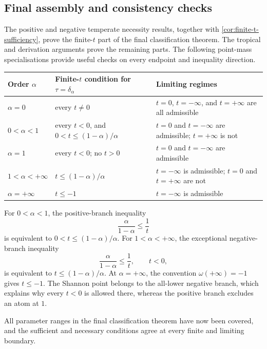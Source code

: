 \documentclass[9pt]{extarticle}
\theoremstyle{definition}
\theoremstyle{remark}
\begin{document}
\subsection{Final assembly and consistency checks}

The positive and negative temperate necessity results, together with
\cref{cor:finite-t-sufficiency}, prove the finite-$t$ part of the final
classification theorem. The tropical and derivation arguments prove
the remaining parts. The following point-mass specialisations provide useful
checks on every endpoint and inequality direction.

\begin{center}
\begin{tabular}{>{\raggedright\arraybackslash}p{}
                >{\raggedright\arraybackslash}p{}
                >{\raggedright\arraybackslash}p{}}
\toprule
Order $\alpha$ & Finite-$t$ condition for $\tau=\delta_\alpha$
& Limiting regimes \\
\midrule
$\alpha=0$
& every $t\neq0$
& $t=0$, $t=-\infty$, and $t=+\infty$ are all admissible \\
$0<\alpha<1$
& every $t<0$, and $0<t\leq(1-\alpha)/\alpha$
& $t=0$ and $t=-\infty$ are admissible; $t=+\infty$ is not \\
$\alpha=1$
& every $t<0$; no $t>0$
& $t=0$ and $t=-\infty$ are admissible \\
$1<\alpha<+\infty$
& $t\leq(1-\alpha)/\alpha$
& $t=-\infty$ is admissible; $t=0$ and $t=+\infty$ are not \\
$\alpha=+\infty$
& $t\leq-1$
& $t=-\infty$ is admissible \\
\bottomrule
\end{tabular}
\end{center}

For $0<\alpha<1$, the positive-branch inequality
\[
 \frac{\alpha}{1-\alpha}\leq\frac1t
\]
is equivalent to $0<t\leq(1-\alpha)/\alpha$. For
$1<\alpha<+\infty$, the exceptional negative-branch inequality
\[
 \frac{\alpha}{1-\alpha}\leq\frac1t,
 \qquad t<0,
\]
is equivalent to $t\leq(1-\alpha)/\alpha$. At $\alpha=+\infty$, the
convention $\omega(+\infty)=-1$ gives $t\leq-1$. The Shannon point belongs
to the all-lower negative branch, which explains why every $t<0$ is allowed
there, whereas the positive branch excludes an atom at $1$.

All parameter ranges in the final classification theorem have now been covered,
and the sufficient and necessary conditions agree at every finite and
limiting boundary.
\end{document}
